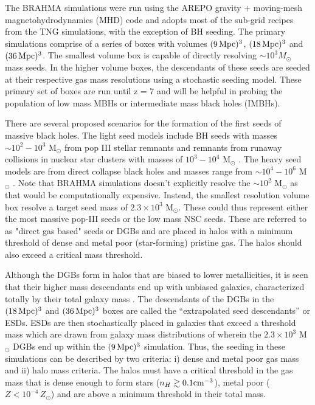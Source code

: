 \documentclass[11pt, letterpaper]{article}
\newcommand{\msun}{M$_{\odot}$}
\begin{document}
The BRAHMA simulations were run using the AREPO gravity + moving-mesh magnetohydrodynamics (MHD) code \citep{Springel_2010,Pakmor_2016,Weinberger_2020} and adopts most of the sub-grid recipes from the TNG simulations, with the exception of BH seeding. The primary simulations comprise of a series of boxes with volumes $(9 \, \rm Mpc)^3$, $(18 \, \rm Mpc)^3$ and $(36 \, \rm Mpc)^3$. The smallest volume box is capable of directly resolving $\sim 10^3 M_{\odot}$ mass seeds. In the higher volume boxes, the descendants of these seeds are seeded at their respective gas mass resolutions using a stochastic seeding model. These primary set of boxes are run until z = 7 and will be helpful in probing the population of low mass MBHs or intermediate mass black holes (IMBHs). 

There are several proposed scenarios for the formation of the first seeds of massive black holes. The light seed models include BH seeds with masses $\sim 10^2-10^3$ \msun{} from pop III stellar remnants \citep{Fryer_2001,Madau_2001,Smith_2018,Xu_2013} and remnants from runaway collisions in nuclear star clusters with masses of $10^3-10^4$ \msun{} \citep{Davis_1985,Lupi_2014,Kroupa_2020,Das_2021}. The heavy seed models are from direct collapse black holes and masses range from $\sim 10^4 -10^6$ \msun{} \citep{Bromm_Loeb_2003,Begelman_2006,Regan_2014}. Note that BRAHMA simulations doesn't explicitly resolve the $\sim 10^2$ \msun{} as that would be computationally expensive. Instead, the smallest resolution volume box resolve a target seed mass of $2.3 \times 10^{3}$ \msun{}. These could thus represent either the most massive pop-III seeds or the low mass NSC seeds. These are referred to as "direct gas based" seeds or DGBs and are placed in halos with a minimum threshold of dense and metal poor (star-forming) pristine gas. The halos should also exceed a critical mass threshold. 

Although the DGBs form in halos that are biased to lower metallicities, it is seen that their higher mass descendants end up with unbiased galaxies, characterized totally by their total galaxy mass \citep{bhowmick2023representinglowmassblack}. The descendants of the DGBs in the $(18 \, \rm Mpc)^3$ and $(36 \, \rm Mpc)^3$ boxes are called the “extrapolated seed descendants” or ESDs. ESDs are then stochastically placed in galaxies that exceed a threshold mass which are drawn from galaxy mass distributions of wherein the $2.3 \times 10^{3}$ \msun{} DGBs end up within the $(9 \, \rm Mpc)^3$  simulation. Thus, the seeding in these simulations can be described by two criteria: i) dense and metal poor gas mass and ii) halo mass criteria. The halos must have a critical threshold in the gas mass that is dense enough to form stars ($n_H \gtrsim 0.1 \rm cm^{-3} $), metal poor ($Z < 10^{-4} \, Z_{\odot}$) and are above a minimum threshold in their total mass. 
\end{document}
